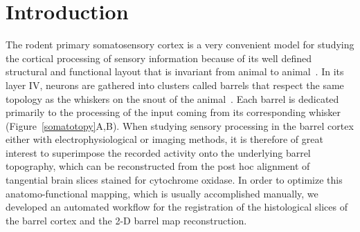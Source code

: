 
\section{Introduction}



The rodent primary somatosensory cortex is a very convenient model for studying the cortical processing of sensory information because of its well defined structural and functional layout that is invariant from animal to animal~\cite{WelkerQuantitative,MeyerCellular,egger_2012}. In its layer IV, neurons are gathered into clusters called barrels that respect the same topology as the whiskers on the snout of the animal~\cite{Woosley-VDLoos}. Each barrel is dedicated primarily to the processing of the input coming from its corresponding whisker (Figure~\ref{somatotopy}A,B).  
When studying sensory processing in the barrel cortex either with electrophysiological or imaging methods, it is therefore of great interest to superimpose the recorded activity onto the underlying barrel topography, which can be reconstructed from the post hoc alignment of tangential brain slices stained for cytochrome oxidase.
In order to optimize this anatomo-functional mapping, which is usually accomplished manually, we developed an automated workflow for the registration of the histological slices of the barrel cortex and the 2-D barrel map reconstruction.


